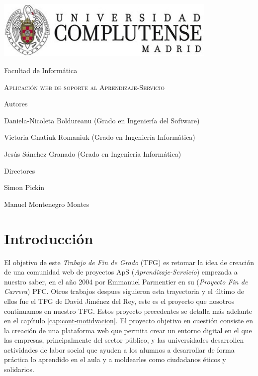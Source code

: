 \documentclass[11pt]{book}
\begin{document}
\begin{titlepage}
	\centering
	{\includegraphics[width=0.8\textwidth]{logo}\par}
	\vspace{1cm}
	{\Large Facultad de Informática \par}
	\vspace{3cm}
	{\scshape\Huge Aplicación web de soporte al Aprendizaje-Servicio \par}
	\vspace{5cm}
	{\textbf\Large Autores \par}
	{\Large Daniela-Nicoleta Boldureanu (Grado en Ingeniería del Software)\par}
	{\Large Victoria Gnatiuk Romaniuk (Grado en Ingeniería Informática)\par}
	{\Large Jesús Sánchez Granado (Grado en Ingeniería Informática)\par}
	\vspace{1cm}
	{\textbf\Large Directores \par}
	{\Large Simon Pickin \par}
	{\Large Manuel Montenegro Montes \par}
	
\end{titlepage}


\tableofcontents
\newpage
\listoffigures

\chapter{Introducción}
El objetivo de este \textit{Trabajo de Fin de Grado} (TFG) es retomar la idea de creación de una comunidad web de proyectos ApS (\emph{Aprendizaje-Servicio}) empezada a nuestro saber, en el año 2004 por Emmanuel Parmentier en su (\emph{Proyecto Fin de Carrera}) PFC. Otros trabajos despues siguieron esta trayectoria y el último de ellos fue el TFG de David Jiménez del Rey, este es el proyecto que nosotros continuamos en nuestro TFG. Estos proyecto precedentes se detalla más adelante en el capítulo \ref{cap:cont-motidvacion}. El proyecto objetivo en cuestión consiste en la creación de una plataforma web que permita crear un entorno digital en el que las empresas, principalmente del sector público, y las universidades desarrollen actividades de labor social que ayuden a los alumnos a desarrollar de forma práctica lo aprendido en el aula y a moldearles como ciudadanos éticos y solidarios.
\end{document}

